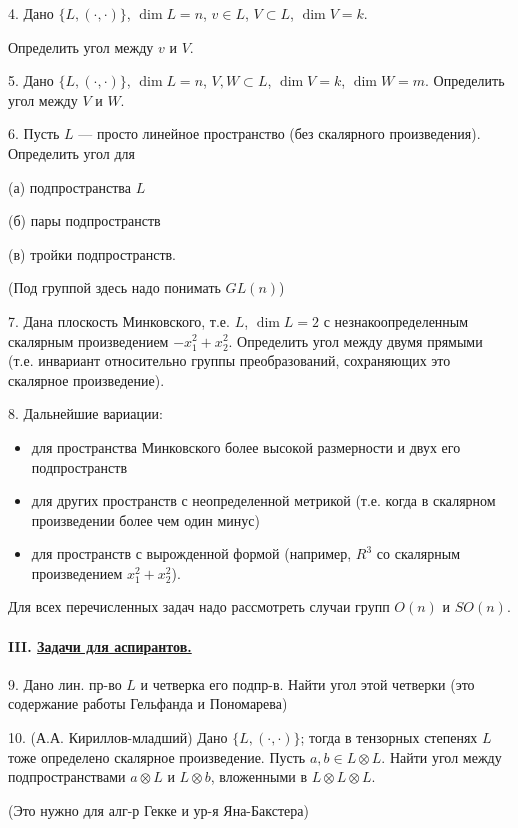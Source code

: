 4. Дано $\{L,(\cdot,\cdot)\}$, $\dim L=n$, $v\in L$, $V\subset L$,
$\dim V=k$.

Определить угол между $v$ и $V$.


5. Дано $\{L,(\cdot,\cdot)\}$, $\dim L=n$, $V,W\subset L$,
$\dim V=k$, $\dim W=m$. Определить угол между $V$ и $W$.

6. Пусть $L$ — просто линейное пространство (без скалярного
произведения). Определить угол для

(а) подпространства $L$

(б) пары подпространств

(в) тройки подпространств.

(Под группой здесь надо понимать $GL(n)$)

7. Дана плоскость Минковского, т.е. $L$, $\dim L=2$
с незнакоопределенным скалярным произведением $-x_1^2+x_2^2$.
Определить угол между двумя прямыми (т.е. инвариант
относительно группы преобразований, сохраняющих это
скалярное произведение).

8. Дальнейшие вариации:
\begin{itemize}
\item[—] для пространства Минковского более высокой размерности
и двух его подпространств
\item[—] для других пространств с неопределенной метрикой
(т.е. когда в скалярном произведении более чем один минус)
\item[—] для пространств с вырожденной формой (например, $R^3$
со скалярным произведением $x_1^2+x_2^2$).
\end{itemize}

Для всех перечисленных задач надо рассмотреть случаи
групп $O(n)$ и $SO(n)$.

\paragraph*{III. \underline{Задачи для аспирантов.}}
9. Дано лин. пр-во $L$ и четверка его подпр-в. Найти угол
этой четверки (это содержание работы Гельфанда и Пономарева)

10. (А.А. Кириллов-младший) Дано $\{L,(\cdot,\cdot)\}$; тогда в тензорных
степенях $L$ тоже определено скалярное произведение. Пусть
$a,b\in L\otimes L$. Найти угол между подпространствами $a\otimes L$ и
$L\otimes b$, вложенными в $L\otimes L\otimes L$.

(Это нужно для алг-р Гекке и ур-я Яна-Бакстера)



